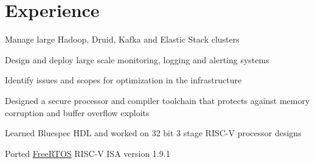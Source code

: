 \documentclass[]{illustris-resume-openfont}
\newcommand{\myul}[2][black]{\setulcolor{#1}\ul{#2}\setulcolor{black}}
\begin{document}
\begin{minipage}[t]{0.66\textwidth} 


\section{Experience}

\vspace{\topsep} %
\begin{tightemize}\item Manage large Hadoop, Druid, Kafka and Elastic Stack clusters
\item Design and deploy large scale monitoring, logging and alerting systems
\item Identify issues and scopes for optimization in the infrastructure
\end{tightemize}
\sectionsep

\vspace{\topsep} %
\begin{tightemize}\item Designed a secure processor and compiler toolchain that protects against memory corruption and buffer overflow exploits
\end{tightemize}
\sectionsep

\vspace{\topsep} %
\begin{tightemize}\item Learned Bluespec HDL and worked on 32 bit 3 stage RISC-V processor designs
\item Ported \href{https://github.com/illustris/freertos-riscv}{\color{blue} \myul[blue] {FreeRTOS}} RISC-V ISA version 1.9.1
\end{tightemize}


\end{minipage}
\end{document}
